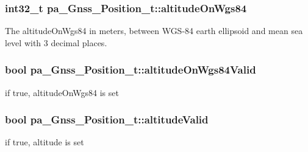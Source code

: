 \subsubsection[{\texorpdfstring{altitude\+On\+Wgs84}{altitudeOnWgs84}}]{\setlength{\rightskip}{0pt plus 5cm}int32\+\_\+t pa\+\_\+\+Gnss\+\_\+\+Position\+\_\+t\+::altitude\+On\+Wgs84}\hypertarget{structpa___gnss___position__t_a7a98e437955e9839203934bc35a09e06}{}\label{structpa___gnss___position__t_a7a98e437955e9839203934bc35a09e06}
The altitude\+On\+Wgs84 in meters, between W\+G\+S-\/84 earth ellipsoid and mean sea level with 3 decimal places. 
\subsubsection[{\texorpdfstring{altitude\+On\+Wgs84\+Valid}{altitudeOnWgs84Valid}}]{\setlength{\rightskip}{0pt plus 5cm}bool pa\+\_\+\+Gnss\+\_\+\+Position\+\_\+t\+::altitude\+On\+Wgs84\+Valid}\hypertarget{structpa___gnss___position__t_a2f87cf58db4cd97a1ccde671cd1f44f0}{}\label{structpa___gnss___position__t_a2f87cf58db4cd97a1ccde671cd1f44f0}


if true, altitude\+On\+Wgs84 is set 

\subsubsection[{\texorpdfstring{altitude\+Valid}{altitudeValid}}]{\setlength{\rightskip}{0pt plus 5cm}bool pa\+\_\+\+Gnss\+\_\+\+Position\+\_\+t\+::altitude\+Valid}\hypertarget{structpa___gnss___position__t_ac9cc767e7159bc7eabe16787366a3f11}{}\label{structpa___gnss___position__t_ac9cc767e7159bc7eabe16787366a3f11}


if true, altitude is set 

